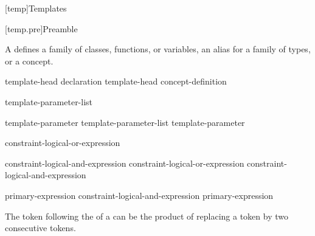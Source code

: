 [temp]{Templates}%


%

[temp.pre]{Preamble}

\pnum
A  defines a family of classes, functions, or variables,
an alias for a family of types, or a concept.

%
%
\begin{bnf}
\br
  template-head declaration\br
  template-head concept-definition
\end{bnf}

\begin{bnf}
\br
   \terminal{<} template-parameter-list \terminal{>} 
\end{bnf}

\begin{bnf}
\br
  template-parameter\br
  template-parameter-list \terminal{,} template-parameter
\end{bnf}

\begin{bnf}
\br
   constraint-logical-or-expression
\end{bnf}

\begin{bnf}
\br
  constraint-logical-and-expression\br
  constraint-logical-or-expression \terminal{||} constraint-logical-and-expression
\end{bnf}

\begin{bnf}
\br
  primary-expression\br
  constraint-logical-and-expression \terminal{\&\&} primary-expression
\end{bnf}

\begin{note}
The \tcode{>} token following the
 of a
can be the product of replacing a
\tcode{>>} token by two consecutive \tcode{>}
tokens.
\end{note}

